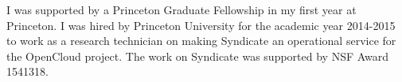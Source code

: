 I was supported by a Princeton Graduate Fellowship in my first year at
Princeton.  I was hired by Princeton University for the academic year 2014-2015
to work as a research technician on making Syndicate an operational service for
the OpenCloud project.  The work on Syndicate was supported by NSF Award 1541318.
